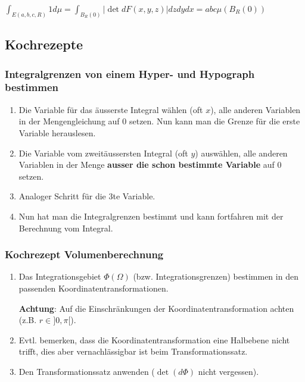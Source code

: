 \documentclass[a4paper, fontsize = 8pt, landscape]{scrartcl}
\begin{document}
\begin{multicols*}{3}
\begin{small}
        $\int_{E(a, b, c, R)} 1 d \mu=\int_{B_{R}(0)}|\det d F(x, y, z)| d z d y d x = abc \mu\left(B_{R}(0)\right)$

        \subsection{Kochrezepte}

        \subsubsection{Integralgrenzen von einem Hyper- und Hypograph bestimmen}

        \begin{enumerate}
            \item Die Variable für das äusserste Integral wählen (oft $x$), alle anderen Variablen in der Mengengleichung auf $0$ setzen. Nun kann man die Grenze für die erste Variable herauslesen.
            \item Die Variable vom zweitäussersten Integral (oft $y$) auswählen, alle anderen Variablen in der Menge \textbf{ausser die schon bestimmte Variable} auf $0$ setzen.
            \item[2.5] Analoger Schritt für die 3te Variable.
            \item Nun hat man die Integralgrenzen bestimmt und kann fortfahren mit der Berechnung vom Integral.
        \end{enumerate}


        \subsubsection{Kochrezept Volumenberechnung}

        \begin{enumerate}
            \item Das Integrationsgebiet $\Phi(\Omega)$ (bzw. Integrationsgrenzen) bestimmen in den passenden Koordinatentransformationen.

                  \textbf{Achtung}: Auf die Einschränkungen der Koordinatentransformation achten (z.B. $r \in ]0,\pi[$).
            \item[1.5] Evtl. bemerken, dass die Koordinatentransformation eine Halbebene nicht trifft, dies aber vernachlässigbar ist beim Transformationssatz.
            \item Den Transformationssatz anwenden ($\det(d\Phi)$ nicht vergessen).
        \end{enumerate}



\end{small}
\end{multicols*}
\end{document}
